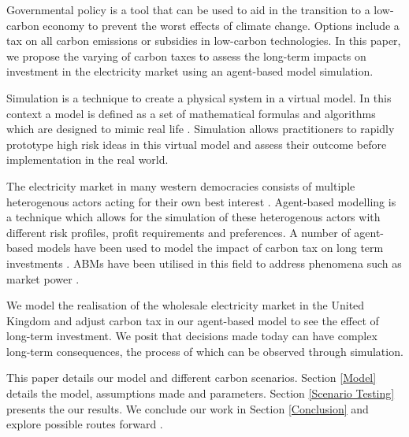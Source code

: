 
Governmental policy is a tool that can be used to aid in the transition to a low-carbon economy to prevent the worst effects of climate change. Options include a tax on all carbon emissions or subsidies in low-carbon technologies. In this paper, we propose the varying of carbon taxes to assess the long-term impacts on investment in the electricity market using an agent-based model simulation. 


Simulation is a technique to create a physical system in a virtual model.  In this context a model is defined as a set of mathematical formulas and algorithms which are designed to mimic real life \cite{Forshaw2016}. Simulation allows practitioners to rapidly prototype high risk ideas in this virtual model and assess their outcome before implementation in the real world.

The electricity market in many western democracies consists of multiple heterogenous actors acting for their own best interest \cite{Most2010}. Agent-based modelling is a technique which allows for the simulation of these heterogenous actors with different risk profiles, profit requirements and preferences. A number of agent-based models have been used to model the impact of carbon tax on long term investments \cite{Tang2015, Chen2014, Chappin2017}. ABMs have been utilised in this field to address phenomena such as market power \cite{Ringler2016a}.

We model the realisation of the wholesale electricity market in the United Kingdom and adjust carbon tax in our agent-based model to see the effect of long-term investment. We posit that decisions made today can have complex long-term consequences, the process of which can be observed through simulation.



This paper details our model and different carbon scenarios. Section \ref{Model} details the model, assumptions made and parameters. Section \ref{Scenario Testing} presents the our results. We conclude our work in Section \ref{Conclusion} and explore possible routes forward .


